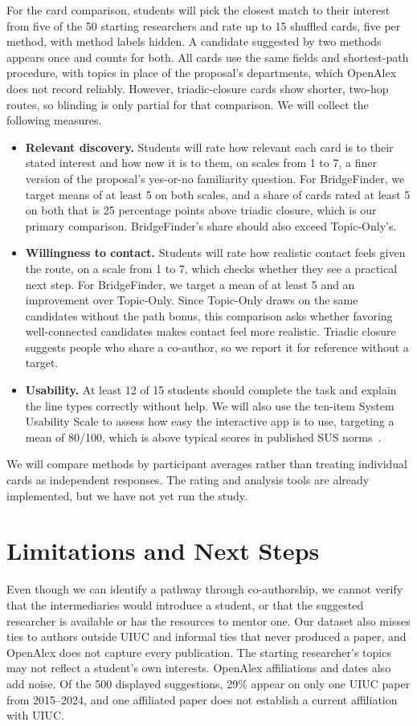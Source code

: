 \documentclass[10pt,twocolumn,letterpaper]{article}
\begin{document}
For the card comparison, students will pick the closest match to their interest from five of the 50 starting researchers and rate up to 15 shuffled cards, five per method, with method labels hidden. A candidate suggested by two methods appears once and counts for both. All cards use the same fields and shortest-path procedure, with topics in place of the proposal's departments, which OpenAlex does not record reliably. However, triadic-closure cards show shorter, two-hop routes, so blinding is only partial for that comparison. We will collect the following measures.
\begin{itemize}
\setlength{\itemsep}{2pt}
\item \textbf{Relevant discovery.} Students will rate how relevant each card is to their stated interest and how new it is to them, on scales from 1 to 7, a finer version of the proposal's yes-or-no familiarity question. For BridgeFinder, we target means of at least 5 on both scales, and a share of cards rated at least 5 on both that is 25 percentage points above triadic closure, which is our primary comparison. BridgeFinder's share should also exceed Topic-Only's.
\item \textbf{Willingness to contact.} Students will rate how realistic contact feels given the route, on a scale from 1 to 7, which checks whether they see a practical next step. For BridgeFinder, we target a mean of at least 5 and an improvement over Topic-Only. Since Topic-Only draws on the same candidates without the path bonus, this comparison asks whether favoring well-connected candidates makes contact feel more realistic. Triadic closure suggests people who share a co-author, so we report it for reference without a target.
\item \textbf{Usability.} At least 12 of 15 students should complete the task and explain the line types correctly without help. We will also use the ten-item System Usability Scale to assess how easy the interactive app is to use, targeting a mean of 80/100, which is above typical scores in published SUS norms~\cite{bangor2008}.
\end{itemize}
We will compare methods by participant averages rather than treating individual cards as independent responses. The rating and analysis tools are already implemented, but we have not yet run the study.

\section{Limitations and Next Steps}
Even though we can identify a pathway through co-authorship, we cannot verify that the intermediaries would introduce a student, or that the suggested researcher is available or has the resources to mentor one. Our dataset also misses ties to authors outside UIUC and informal ties that never produced a paper, and OpenAlex does not capture every publication. The starting researcher's topics may not reflect a student's own interests. OpenAlex affiliations and dates also add noise. Of the 500 displayed suggestions, 29\% appear on only one UIUC paper from 2015--2024, and one affiliated paper does not establish a current affiliation with UIUC.
\end{document}
